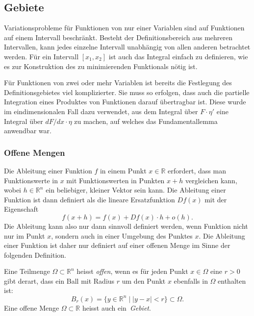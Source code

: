 %
%
%

%
%
\subsection{Gebiete}
Variationsprobleme für Funktionen von nur einer Variablen sind auf 
Funktionen auf einem Intervall beschränkt.
Besteht der Definitionsbereich aus mehreren Intervallen, kann jedes
einzelne Intervall unabhängig von allen anderen betrachtet werden.
Für ein Intervall $[x_1,x_2]$ ist auch das Integral einfach zu definieren,
wie es zur Konstruktion des zu minimierenden Funktionals nötig ist.

Für Funktionen von zwei oder mehr Variablen ist bereits die
Festlegung des Definitionsgebietes viel komplizierter.
Sie muss so erfolgen, dass auch die partielle Integration eines
Produktes von Funktionen darauf übertragbar ist.
Diese wurde im eindimensionalen Fall dazu verwendet, aus dem Integral
über $F\cdot\eta'$ eine Integral über $dF/dx\cdot \eta$ zu
machen, auf welches das Fundamentallemma anwendbar war.

%
%
\subsubsection{Offene Mengen}
Die Ableitung einer Funktion $f$ in einem Punkt $x\in\mathbb{R}$ erfordert,
dass man Funktionswerte in $x$ mit Funktionswerten in Punkten $x+h$
vergleichen kann, wobei $h\in\mathbb{R}^n$ ein beliebiger, kleiner Vektor
sein kann.
Die Ableitung einer Funktion ist dann definiert als die lineare
Ersatzfunktion $Df(x)$ mit der Eigenschaft
\[
f(x+h) = f(x) + Df(x)\cdot h + o(h).
\]
Die Ableitung kann also nur dann sinnvoll definiert werden, wenn
Funktion nicht nur im Punkt $x$, sondern auch in einer Umgebung
des Punktes $x$.
Die Ableitung einer Funktion ist daher nur definiert auf einer
offenen Menge im Sinne der folgenden Definition.


\begin{definition}
Eine Teilmenge $\Omega\subset\mathbb{R}^n$ heisst {\em offen}, wenn es für
%
jeden Punkt $x\in\Omega$ eine $r>0$ gibt derart, dass ein
Ball mit Radius $r$ um den Punkt $x$ ebenfalls in $\Omega$ enthalten
ist:
\[
B_r(x)
=
\{y\in\mathbb{R}^n
\mid
|y-x|<r\}
\subset \Omega.
\]
Eine offene Menge $\Omega\subset\mathbb{R}$ heisst auch ein {\em Gebiet}.
%
\end{definition}

